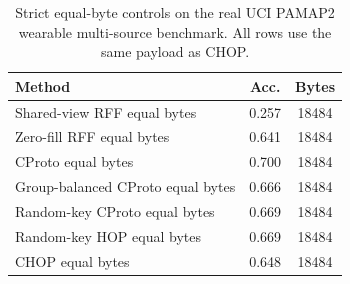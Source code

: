 \begin{table}[t]
\centering
\caption{Strict equal-byte controls on the real UCI PAMAP2 wearable multi-source benchmark. All rows use the same payload as CHOP.}
\label{tab:strict-equal-byte-pamap2}
\begin{tabular}{lcc}
\toprule
Method & Acc. & Bytes \\
\midrule
Shared-view RFF equal bytes & 0.257 & 18484 \\
Zero-fill RFF equal bytes & 0.641 & 18484 \\
CProto equal bytes & 0.700 & 18484 \\
Group-balanced CProto equal bytes & 0.666 & 18484 \\
Random-key CProto equal bytes & 0.669 & 18484 \\
Random-key HOP equal bytes & 0.669 & 18484 \\
CHOP equal bytes & 0.648 & 18484 \\
\bottomrule
\end{tabular}
\end{table}
